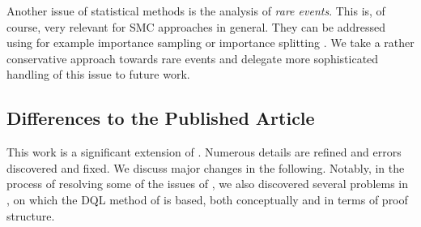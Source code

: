 \documentclass{theoretics}
\begin{document}
Another issue of statistical methods is the analysis of \emph{rare events}.
This is, of course, very relevant for SMC approaches in general.
They can be addressed using for example importance sampling \cite{DBLP:conf/tacas/JegourelLS12,DBLP:conf/kbse/HeJBGW10} or importance splitting \cite{DBLP:conf/cav/JegourelLS13,DBLP:conf/setta/BuddeDH17}.
We take a rather conservative approach towards rare events and delegate more sophisticated handling of this issue to future work.



\subsection{Differences to the Published Article} \label{sec:intro:differences}

This work is a significant extension of \cite{DBLP:conf/atva/BrazdilCCFKKPU14}.
Numerous details are refined and errors discovered and fixed.
We discuss major changes in the following.
Notably, in the process of resolving some of the issues of \cite{DBLP:conf/atva/BrazdilCCFKKPU14}, we also discovered several problems in \cite{DBLP:conf/icml/StrehlLWLL06}, on which the DQL method of \cite{DBLP:conf/atva/BrazdilCCFKKPU14} is based, both conceptually and in terms of proof structure.
\end{document}
